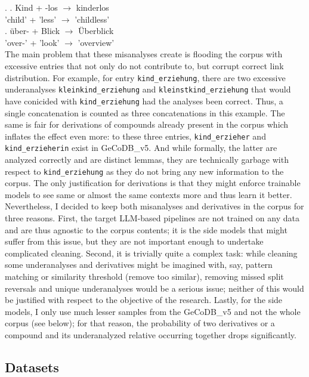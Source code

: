 \documentclass[11pt]{article}
\begin{document}
\ex. \label{ex15}
\ag. \label{ex15:1}Kind + -los {$\rightarrow$} kinderlos \\
'child' + 'less' {$\rightarrow$} 'childless' \\
\bg. {\"u}ber- + Blick {$\rightarrow$} {\"U}berblick \\
'over-' + 'look' {$\rightarrow$} 'overview' \\


The main problem that these misanalyses create is flooding the corpus with excessive entries that not only do not contribute to, but corrupt correct link distribution. For example, for entry \texttt{kind\_erziehung}, there are two excessive underanalyses \texttt{kleinkind\_erziehung} and \texttt{kleinstkind\_erziehung} that would have conicided with \texttt{kind\_erziehung} had the analyses been correct. Thus, a single concatenation is counted as three concatenations in this example. The same is fair for derivations of compounds already present in the corpus which inflates the effect even more: to these three entries, \texttt{kind\_erzieher} and \texttt{kind\_erzieherin} exist in GeCoDB\_v5. And while formally, the latter are analyzed correctly and are distinct lemmas, they are technically garbage with respect to \texttt{kind\_erziehung} as they do not bring any new information to the corpus. The only justification for derivations is that they might enforce trainable models to see same or almost the same contexts more and thus learn it better.
Nevertheless, I decided to keep both misanalyses and derivatives in the corpus for three reasons. First, the target LLM-based pipelines are not trained on any data and are thus agnostic to the corpus contents; it is the side models that might suffer from this issue, but they are not important enough to undertake complicated cleaning. Second, it is trivially quite a complex task: while cleaning some underanalyses and derivatives might be imagined with, say, pattern matching or similarity threshold (remove too similar), removing missed split reversals and unique underanalyses would be a serious issue; neither of this would be justified with respect to the objective of the research. Lastly, for the side models, I only use much lesser samples from the GeCoDB\_v5 and not the whole corpus (see below); for that reason, the probability of two derivatives or a compound and its underanalyzed relative occurring together drops significantly.


\subsection{Datasets}
\label{subsec:datasets}
\end{document}
